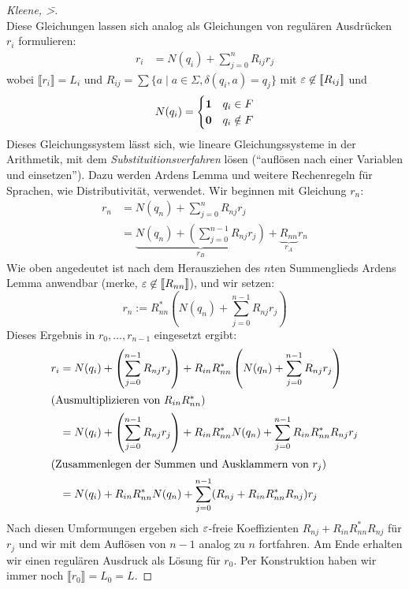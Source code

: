 \begin{proof}[Kleene, \=>]
\begin{displaymath}
    \end{displaymath}
    Diese Gleichungen lassen sich analog als Gleichungen von regulären Ausdrücken $r_i$ formulieren:
    \begin{align*}
      r_i &= N(q_i) + \sum_{j = 0}^n R_{ij} r_j
    \end{align*}
    wobei $\llbracket r_i \rrbracket = L_i$ und $R_{ij } = \sum \{a \mid a \in \Sigma, \delta(q_i, a) = q_j\}$ mit $\varepsilon \not \in [\![ R_{ij} ]\!]$ und
    \begin{displaymath}
      N(q_i) =
      \begin{cases}
        \mathbf{1} & q_i\in F\\
        \mathbf{0} & q_i\notin F
      \end{cases}
    \end{displaymath}
    Dieses Gleichungssystem lässt sich, wie lineare Gleichungssysteme in der Arithmetik, mit dem \emph{Substituitionsverfahren} lösen ("`auflösen nach einer Variablen und einsetzen"').
    Dazu werden Ardens Lemma und weitere Rechenregeln für Sprachen, wie Distributivität, verwendet.
    Wir beginnen mit Gleichung $r_n$:
    \begin{align*}
      r_n &= N(q_n) + \sum_{j = 0}^n R_{nj} r_j \\
          &= \underbrace{N(q_n) + \left (\sum_{j = 0}^{n-1} R_{nj} r_j \right)}_{r_B} + \underbrace{R_{nn}}_{r_A} r_n
    \end{align*}
    Wie oben angedeutet ist nach dem Herausziehen des $n$ten Summenglieds Ardens Lemma anwendbar (merke, $\varepsilon \not \in [\![ R_{nn} ]\!]$), und wir setzen:
    \begin{displaymath}
      r_n := R_{nn}^*\left(N(q_n) + \sum_{j = 0}^{n-1} R_{nj} r_j  \right)
    \end{displaymath}
    Dieses Ergebnis in $r_0,\ldots,r_{n-1}$ eingesetzt ergibt:
    \begin{align*}
      r_i &= N(q_i) + \left (\sum_{j = 0}^{n-1} R_{nj} r_j \right) + R_{in}R_{nn}^*\left(N(q_n) + \sum_{j = 0}^{n-1} R_{nj} r_j  \right) \\
      \intertext{(Ausmultiplizieren von $R_{in}R_{nn}^*$)}
          &= N(q_i) + \left (\sum_{j = 0}^{n-1} R_{nj} r_j \right) + R_{in}R_{nn}^*N(q_n) + \sum_{j = 0}^{n-1} R_{in}R_{nn}^*R_{nj} r_j  \\
      \intertext{(Zusammenlegen der Summen und Ausklammern von $r_j$)}
          &= N(q_i) + R_{in}R_{nn}^*N(q_n) + \sum_{j = 0}^{n-1} (R_{nj} + R_{in}R_{nn}^*R_{nj}) r_j  \\
    \end{align*}
  Nach diesen Umformungen ergeben sich $\varepsilon$-freie Koeffizienten $R_{nj} + R_{in}R_{nn}^*R_{nj}$ für $r_j$ und wir mit dem Auflösen von $n-1$ analog zu $n$ fortfahren.
  Am Ende erhalten wir einen regulären Ausdruck als Lösung für $r_0$.
  Per Konstruktion haben wir immer noch $\llbracket r_0 \rrbracket = L_0 = L$.
  \end{proof}
    

